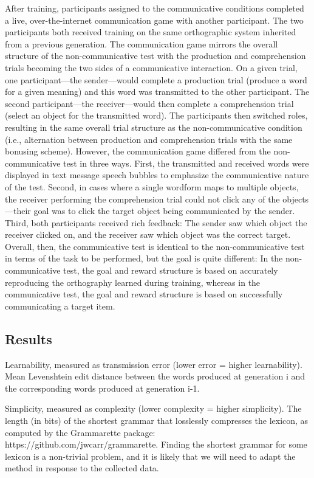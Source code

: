 \documentclass[doc,biblatex]{apa7}
\begin{document}
After training, participants assigned to the communicative conditions completed a live, over-the-internet communication game with another participant. The two participants both received training on the same orthographic system inherited from a previous generation. The communication game mirrors the overall structure of the non-communicative test with the production and comprehension trials becoming the two sides of a communicative interaction. On a given trial, one participant---the sender---would complete a production trial (produce a word for a given meaning) and this word was transmitted to the other participant. The second participant---the receiver---would then complete a comprehension trial (select an object for the transmitted word). The participants then switched roles, resulting in the same overall trial structure as the non-communicative condition (i.e., alternation between production and comprehension trials with the same bonusing scheme). However, the communication game differed from the non-communicative test in three ways. First, the transmitted and received words were displayed in text message speech bubbles to emphasize the communicative nature of the test. Second, in cases where a single wordform maps to multiple objects, the receiver performing the comprehension trial could not click any of the objects---their goal was to click the target object being communicated by the sender. Third, both participants received rich feedback: The sender saw which object the receiver clicked on, and the receiver saw which object was the correct target. Overall, then, the communicative test is identical to the non-communicative test in terms of the task to be performed, but the goal is quite different: In the non-communicative test, the goal and reward structure is based on accurately reproducing the orthography learned during training, whereas in the communicative test, the goal and reward structure is based on successfully communicating a target item.

\subsection{Results}

Learnability, measured as transmission error (lower error = higher learnability). Mean Levenshtein edit distance between the words produced at generation i and the corresponding words produced at generation i-1.

Simplicity, measured as complexity (lower complexity = higher simplicity). The length (in bits) of the shortest grammar that losslessly compresses the lexicon, as computed by the Grammarette package: https://github.com/jwcarr/grammarette. Finding the shortest grammar for some lexicon is a non-trivial problem, and it is likely that we will need to adapt the method in response to the collected data.
\end{document}
